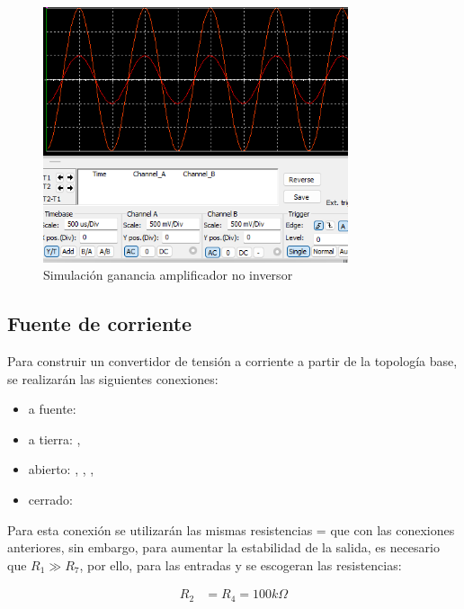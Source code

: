 \begin{figure}[ht]
    \centering
    \includegraphics[width=0.8\textwidth]{src/images/simulaciones/ganancia-no-inversor.png}
    \caption{Simulación ganancia amplificador no inversor}
    \label{fig:sim-amp-no-inversor-ganancia}
\end{figure}

\FloatBarrier
\subsection{Fuente de corriente}

Para construir un convertidor de tensión a corriente a partir de la topología base, se realizarán las siguientes conexiones:

\begin{itemize}
    \item a fuente: 
    \item a tierra: , 
    \item abierto: , , , 
    \item cerrado: 
\end{itemize}

Para esta conexión se utilizarán las mismas resistencias  =  que con las conexiones anteriores, sin embargo, para aumentar la estabilidad de la salida, es necesario que $R_1 \gg R_7$, por ello, para las entradas  y  se escogeran las resistencias:

\begin{align*}
    R_2 &= R_4 = 100k\Omega \\
\end{align*}


